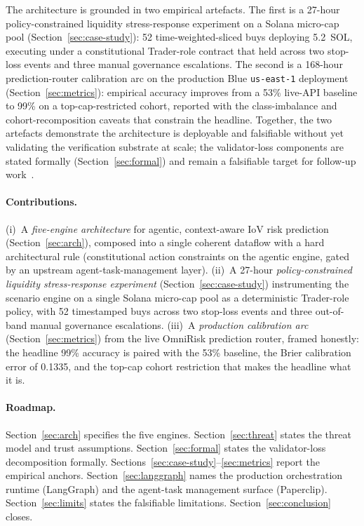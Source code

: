 \documentclass[11pt,a4paper]{article}
\begin{document}
The architecture is grounded in two empirical artefacts. The first is a
27-hour policy-constrained liquidity stress-response experiment on a
Solana micro-cap pool (Section~\ref{sec:case-study}): 52
time-weighted-sliced buys deploying 5.2~SOL, executing under a
constitutional Trader-role contract that held across two stop-loss events
and three manual governance escalations. The second is a 168-hour
prediction-router calibration arc on the production Blue
\texttt{us-east-1} deployment (Section~\ref{sec:metrics}): empirical
accuracy improves from a 53\% live-API baseline to 99\% on a
top-cap-restricted cohort, reported with the class-imbalance and
cohort-recomposition caveats that constrain the headline. Together, the
two artefacts demonstrate the architecture is deployable and falsifiable
without yet validating the verification substrate at scale; the
validator-loss components are stated formally
(Section~\ref{sec:formal}) and remain a falsifiable target for follow-up
work~\cite{omnirisk2026soak}.

\paragraph{Contributions.} (i)~A \emph{five-engine architecture} for
agentic, context-aware IoV risk prediction (Section~\ref{sec:arch}),
composed into a single coherent dataflow with a hard architectural rule
(constitutional action constraints on the agentic engine, gated by an
upstream agent-task-management layer). (ii)~A 27-hour
\emph{policy-constrained liquidity stress-response experiment}
(Section~\ref{sec:case-study}) instrumenting the scenario engine on a
single Solana micro-cap pool as a deterministic Trader-role policy,
with 52 timestamped buys across two stop-loss events and three
out-of-band manual governance escalations. (iii)~A \emph{production
calibration arc} (Section~\ref{sec:metrics}) from the live OmniRisk
prediction router, framed honestly: the headline 99\% accuracy is
paired with the 53\% baseline, the Brier calibration error of 0.1335,
and the top-cap cohort restriction that makes the headline what it is.

\paragraph{Roadmap.} Section~\ref{sec:arch} specifies the five engines.
Section~\ref{sec:threat} states the threat model and trust assumptions.
Section~\ref{sec:formal} states the validator-loss decomposition formally.
Sections~\ref{sec:case-study}--\ref{sec:metrics} report the empirical
anchors. Section~\ref{sec:langgraph} names the production orchestration
runtime (LangGraph) and the agent-task management surface (Paperclip).
Section~\ref{sec:limits} states the falsifiable limitations.
Section~\ref{sec:conclusion} closes.
\end{document}

